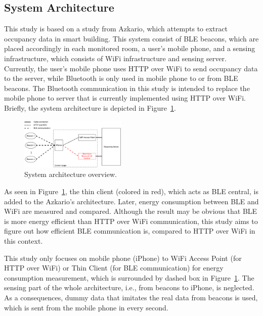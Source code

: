 \documentclass[journal]{vgtc}                %
\begin{document}
\subsection{System Architecture} %
\label{sub:system_architecture}
This study is based on a study from Azkario, which attempts to extract occupancy data in smart building. This system consist of BLE beacons, which are placed accordingly in each monitored room, a user's mobile phone, and a sensing infrastructure, which consists of WiFi infrastructure and sensing server. Currently, the user's mobile phone uses HTTP over WiFi to send occupancy data to the server, while Bluetooth is only used in mobile phone to or from BLE beacons. The Bluetooth communication in this study is intended to replace the mobile phone to server that is currently implemented using HTTP over WiFi. Briefly, the system architecture is depicted in Figure~\ref{fig:system-architecture}. 

\begin{figure}
  \centering
    \includegraphics[width=0.45\textwidth]{system-architecture}
  \caption{System architecture overview.}
  \label{fig:system-architecture}
\end{figure}

As seen in Figure~\ref{fig:system-architecture}, the thin client (colored in red), which acts as BLE central, is added to the Azkario's architecture. Later, energy consumption between BLE and WiFi are measured and compared. Although the result may be obvious that BLE is more energy efficient than HTTP over WiFi communication, this study aims to figure out how efficient BLE communication is, compared to HTTP over WiFi in this context.

This study only focuses on mobile phone (iPhone) to WiFi Access Point (for HTTP over WiFi) or Thin Client (for BLE communication) for energy consumption measurement, which is surrounded by dashed box in Figure~\ref{fig:system-architecture}. The sensing part of the whole architecture, i.e., from beacons to iPhone, is neglected. As a consequences, dummy data that imitates the real data from beacons is used, which is sent from the mobile phone in every second.
\end{document}
